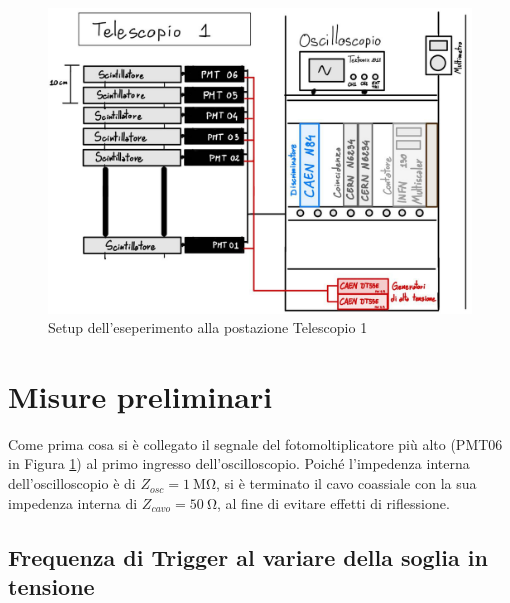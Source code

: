\documentclass[10pt,a4paper]{article}
\begin{document}
\begin{figure}[h]
    \centering
    \includegraphics[width=\columnwidth]{img/setup1.jpeg}
    \caption{Setup dell'eseperimento alla postazione Telescopio 1}
    \label{fig:setup}
\end{figure}


\section{Misure preliminari}

Come prima cosa si è collegato il segnale del fotomoltiplicatore più alto (PMT06 in Figura \ref{fig:setup}) al primo ingresso dell'oscilloscopio. Poiché l'impedenza interna dell'oscilloscopio è di $Z_{osc}=\SI{1}{\mega \ohm}$, si è terminato il cavo coassiale con la sua impedenza interna di $Z_{cavo}=\SI{50}{\ohm}$, al fine di evitare effetti di riflessione.

\subsection{Frequenza di Trigger al variare della soglia in tensione}
\end{document}
